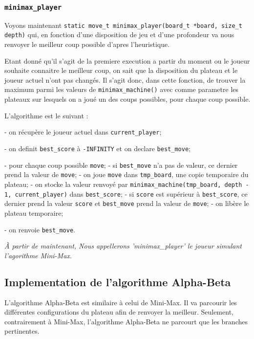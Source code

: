 \documentclass{report}
\begin{document}
\subsubsection{\texttt{minimax\_player}}

Voyons maintenant \texttt{static move\_t minimax\_player(board\_t *board, size\_t depth)} qui, en fonction d'une disposition de jeu et d'une profondeur va nous renvoyer le meilleur coup possible d'apres l'heuristique.

Etant donné qu'il s'agit de la premiere execution a partir du moment ou le joueur souhaite connaitre le meilleur coup, on sait que la disposition du plateau et le joueur actuel n'ont pas changés. Il s'agit donc, dans cette fonction, de trouver la maximum parmi les valeurs de \texttt{minimax\_machine()} avec comme parametre les plateaux sur lesquels on a joué un des coups possibles, pour chaque coup possible.

L'algorithme est le suivant :

- on récupère le joueur actuel dans \texttt{current\_player};

- on definit \texttt{best\_score} à \texttt{-INFINITY} et on declare \texttt{best\_move};

- pour chaque coup possible \texttt{move};
\tabto{1 cm} - si \texttt{best\_move} n'a pas de valeur, ce dernier prend la valeur de \texttt{move};
\tabto{1 cm} - on joue \texttt{move} dans \texttt{tmp\_board}, une copie temporaire du plateau;
\tabto{1 cm} - on stocke la valeur renvoyé par \texttt{minimax\_machine(tmp\_board, depth - 1, current\_player)} dans \texttt{best\_score};
\tabto{1 cm} - si \texttt{score} est supérieur à \texttt{best\_score}, ce dernier prend la valeur \texttt{score} et \texttt{best\_move} prend la valeur de \texttt{move};
\tabto{1 cm} - on libère le plateau temporaire;

- on renvoie \texttt{best\_move}.\newline
\newline



\textit{À partir de maintenant, Nous appellerons 'minimax\_player' le joueur simulant l'agorithme Mini-Max.}

\subsection{Implementation de l'algorithme Alpha-Beta}

L'algorithme Alpha-Beta est similaire à celui de Mini-Max. Il va parcourir les différentes configurations du plateau afin de renvoyer la meilleur. Seulement, contrairement à Mini-Max, l'algorithme Alpha-Beta ne parcourt que les branches pertinentes.\newline
\end{document}
